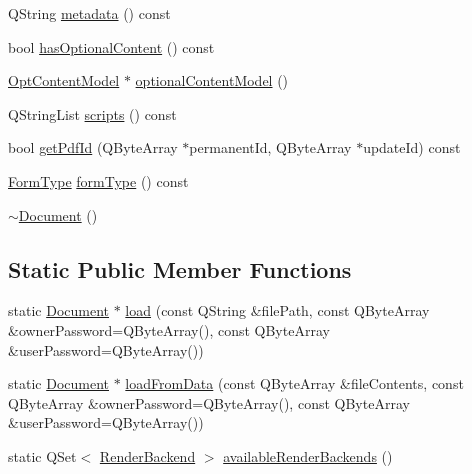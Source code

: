 \begin{DoxyCompactItemize}
\item 
Q\+String \hyperlink{class_poppler_1_1_document_a86276327f2b7d265a11977c33ec07b26}{metadata} () const
\item 
bool \hyperlink{class_poppler_1_1_document_a2db8898b2818eecc73896195ef421a70}{has\+Optional\+Content} () const
\item 
\hyperlink{class_poppler_1_1_opt_content_model}{Opt\+Content\+Model} $\ast$ \hyperlink{class_poppler_1_1_document_aac1edcc34ce0b1bb00aaa3f372157a41}{optional\+Content\+Model} ()
\item 
Q\+String\+List \hyperlink{class_poppler_1_1_document_aed91a0b3de99b9e8f951afea0ad8fd60}{scripts} () const
\item 
bool \hyperlink{class_poppler_1_1_document_a2544975242e00dfb494ecb907e1ac829}{get\+Pdf\+Id} (Q\+Byte\+Array $\ast$permanent\+Id, Q\+Byte\+Array $\ast$update\+Id) const
\item 
\hyperlink{class_poppler_1_1_document_ac761c69f98b581e2e027e309b6b9d8b3}{Form\+Type} \hyperlink{class_poppler_1_1_document_a551458a3d6236a1cea3ab24d26953c06}{form\+Type} () const
\item 
\hyperlink{class_poppler_1_1_document_ab0b992bb0e530f12ff665fba46418af2}{$\sim$\+Document} ()
\end{DoxyCompactItemize}
\subsection*{Static Public Member Functions}
\begin{DoxyCompactItemize}
\item 
static \hyperlink{class_poppler_1_1_document}{Document} $\ast$ \hyperlink{class_poppler_1_1_document_a89330667f1fbc13cdc481cc61f417c82}{load} (const Q\+String \&file\+Path, const Q\+Byte\+Array \&owner\+Password=Q\+Byte\+Array(), const Q\+Byte\+Array \&user\+Password=Q\+Byte\+Array())
\item 
static \hyperlink{class_poppler_1_1_document}{Document} $\ast$ \hyperlink{class_poppler_1_1_document_a47379f6241b011a58c1d8f10cea10dfc}{load\+From\+Data} (const Q\+Byte\+Array \&file\+Contents, const Q\+Byte\+Array \&owner\+Password=Q\+Byte\+Array(), const Q\+Byte\+Array \&user\+Password=Q\+Byte\+Array())
\item 
static Q\+Set$<$ \hyperlink{class_poppler_1_1_document_a4b0a8ab6b6f686c8802a0ad112d48247}{Render\+Backend} $>$ \hyperlink{class_poppler_1_1_document_a3a664ff0948be89cd7ef2585f9e56659}{available\+Render\+Backends} ()
\end{DoxyCompactItemize}
